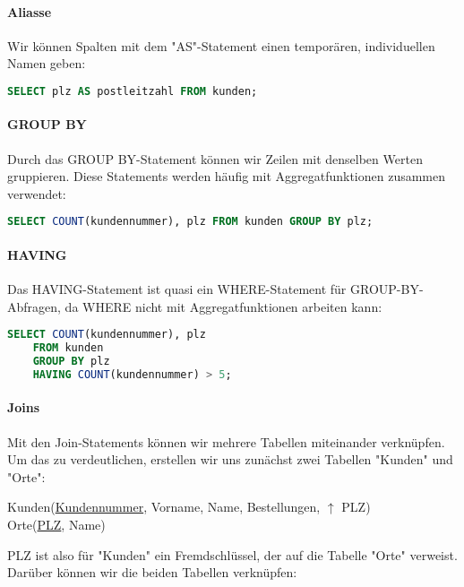 \documentclass{article}
\begin{document}
	\paragraph{Aliasse}
	Wir können Spalten mit dem "AS"-Statement einen temporären, individuellen Namen geben:

	\begin{lstlisting}[language=SQL, caption=Benennt die Spalte "plz" in "postleitzahl" um]
	SELECT plz AS postleitzahl FROM kunden;
	\end{lstlisting}

	\paragraph{GROUP BY}
	Durch das GROUP BY-Statement können wir Zeilen mit denselben Werten gruppieren. Diese Statements werden häufig mit Aggregatfunktionen zusammen verwendet:

	\begin{lstlisting}[language=SQL, caption=Nennt die Zahl der Kunden in den einzelnen Orten]
	SELECT COUNT(kundennummer), plz FROM kunden GROUP BY plz;
	\end{lstlisting}

	\paragraph{HAVING}
	Das HAVING-Statement ist quasi ein WHERE-Statement für GROUP-BY-Abfragen, da WHERE nicht mit Aggregatfunktionen arbeiten kann:

	\begin{lstlisting}[language=SQL, caption=Orte mit mehr als 5 Kunden]
	SELECT COUNT(kundennummer), plz 
	FROM kunden 
	GROUP BY plz 
	HAVING COUNT(kundennummer) > 5;
	\end{lstlisting}

	\paragraph{Joins}
	Mit den Join-Statements können wir mehrere Tabellen miteinander verknüpfen. Um das zu verdeutlichen, erstellen wir uns zunächst zwei Tabellen "Kunden" und "Orte":

	\begin{center}
		Kunden(\underline{Kundennummer}, Vorname, Name, Bestellungen, $\uparrow$ PLZ) \\
		Orte(\underline{PLZ}, Name)
	\end{center}

	PLZ ist also für "Kunden" ein Fremdschlüssel, der auf die Tabelle "Orte" verweist. Darüber können wir die beiden Tabellen verknüpfen:
\end{document}
